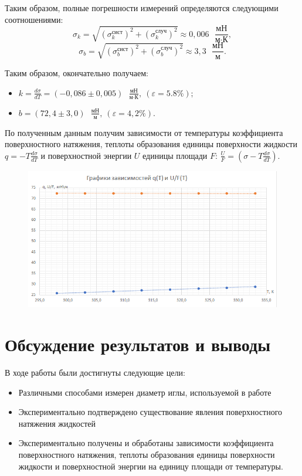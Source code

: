 \documentclass[12pt,a4paper]{article}
\begin{document}
Таким образом, полные погрешности измерений определяются следующими соотношениями:
\[ \sigma_k = \sqrt{(\sigma_k^\text{сист})^2 + (\sigma_k^\text{случ})^2} \approx 0,006 \text{ } \frac{\text{мН}}{\text{м}\cdot\text{К}},\]
\[ \sigma_b = \sqrt{(\sigma_b^\text{сист})^2 + (\sigma_b^\text{случ})^2} \approx 3,3 \text{ } \frac{\text{мН}}{\text{м}}. \]

Таким образом, окончательно получаем:
\begin{itemize}
	\item $ \displaystyle {k = \frac{d\sigma}{dT} = (-0,086 \pm 0,005) \text{ } \frac{\text{мН}}{\text{м}\cdot\text{К}}, \: (\varepsilon = 5.8\%);} $
	\item $ \displaystyle {b = (72,4 \pm 3,0) \text{ } \frac{\text{мН}}{\text{м}}, \: (\varepsilon = 4,2\%).}$
\end{itemize}

По полученным данным получим зависимости от температуры коэффициента поверхностного натяжения,  теплоты образования единицы поверхности жидкости $ \displaystyle {q = -T\frac{d\sigma}{dT}} $ и поверхностной энергии $ U $ единицы площади $ F $: $ \displaystyle {\frac{U}{F} = \left(\sigma - T \frac{d\sigma}{dT}\right).} $


\begin{figure}[H]
	\begin{center}
		\includegraphics[width=14cm]{2.5.1_gr_2}
	\end{center}
\end{figure}

\newpage

\section{Обсуждение результатов и выводы}

В ходе работы были достигнуты следующие цели:
\begin{itemize}
\item Различными способами измерен диаметр иглы, используемой в работе
\item Экспериментально подтверждено существование явления поверхностного натяжения жидкостей
\item Экспериментально получены и обработаны зависимости коэффициента поверхностного натяжения, теплоты образования единицы поверхности жидкости и поверхностной энергии на единицу площади от температуры.
\end{itemize}
\end{document}
